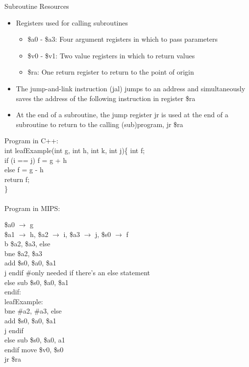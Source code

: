 \documentclass[12pt]{article}
\begin{document}
Subroutine Resources \begin{itemize} 
\item Registers used for calling subroutines \begin{itemize} 
\item \$a0 - \$a3: Four argument registers in which to pass parameters 
\item \$v0 - \$v1: Two value registers in which to return values 
\item \$ra: One return register to return to the point of origin  \end{itemize} 

\item The jump-and-link instruction (jal) jumps to an address and simultaneously saves the address of the following instruction in register \$ra
\item At the end of a subroutine, the jump register jr is used at the end of a subroutine to return to the calling (sub)program, jr \$ra 
\end{itemize} 

Program in C++: \\ int leafExample(int g, int h, int k, int j)\{
\indent int f; \\
\indent if (i == j) f = g + h \\
\indent else f = g - h \\
\indent return f;  \\
\} \\~\\
Program in MIPS:

\$a0 $\to$ g \\ \$a1 $\to$ h, \$a2 $\to$ i, \$a3 $\to$ j, \$s0 $\to$ f \\ 
b \$a2, \$a3, else \\
bne \$a2, \$a3 \\ add \$s0, \$a0, \$a1 \\
j endif \#only needed if there's an else statement \\
else sub \$s0, \$a0, \$a1 \\ 
endif: \\ 

 \noindent leafExample: \\
\indent bne \#a2, \#a3, else \\
 \indent add \$s0, \$a0, \$a1 \\
 \indent j endif \\
 else sub \$s0, \$a0, a1 \\ 
 endif move \$v0, \$s0 \\ 
 \indent jr \$ra \\~\\
\end{document}
